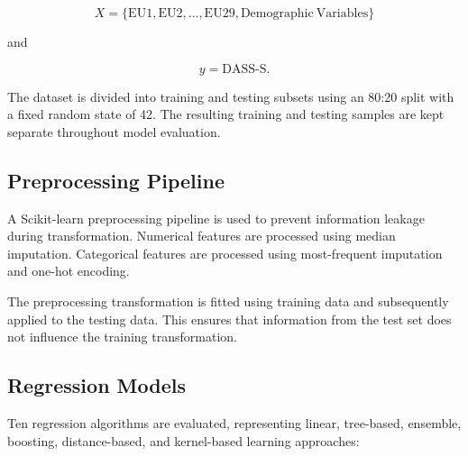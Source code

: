 \documentclass[conference]{IEEEtran}
\begin{document}
\[
X =
\{\mathrm{EU1},\mathrm{EU2},\ldots,\mathrm{EU29},
\mathrm{Demographic\ Variables}\}
\]

and

\[
y = \mathrm{DASS\text{-}S}.
\]

The dataset is divided into training and testing subsets using an 80:20 split with a fixed random state of 42. The resulting training and testing samples are kept separate throughout model evaluation.

\subsection{Preprocessing Pipeline}

A Scikit-learn preprocessing pipeline is used to prevent information leakage during transformation. Numerical features are processed using median imputation. Categorical features are processed using most-frequent imputation and one-hot encoding.

The preprocessing transformation is fitted using training data and subsequently applied to the testing data. This ensures that information from the test set does not influence the training transformation.

\subsection{Regression Models}

Ten regression algorithms are evaluated, representing linear, tree-based, ensemble, boosting, distance-based, and kernel-based learning approaches:
\end{document}
